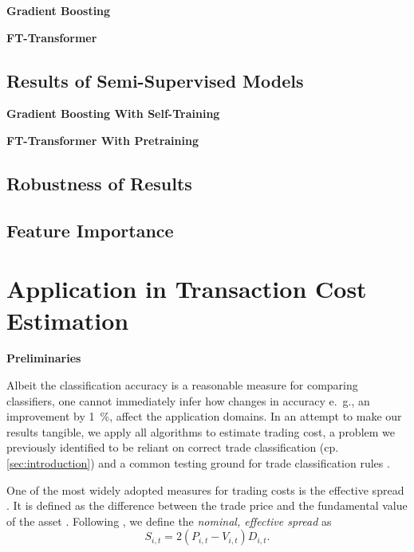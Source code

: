 \textbf{Gradient Boosting}

\textbf{FT-Transformer}

\subsection{Results of Semi-Supervised
    Models}\label{sec:results-of-semi-supervised-models}


\textbf{Gradient Boosting With Self-Training}

\textbf{FT-Transformer With Pretraining}

\subsection{Robustness of Results}\label{sec:robustness-checks}

\subsection{Feature Importance}\label{sec:feature-importance}

\newpage
\section{Application in Transaction Cost Estimation}\label{sec:application}

\textbf{Preliminaries}


Albeit the classification accuracy is a reasonable measure for comparing classifiers, one cannot immediately infer how changes in accuracy e.~g., an improvement by \SI{1}{\percent}, affect the application domains. In an attempt to make our results tangible, we apply all algorithms to estimate trading cost, a problem we previously identified to be reliant on correct trade classification (cp. \cref{sec:introduction}) and a common testing ground for trade classification rules \autocites[cp.][541]{ellisAccuracyTradeClassification2000}[][569]{finucaneDirectTestMethods2000}[][271--278]{petersonEvaluationBiasesExecution2003}[][896--897]{savickasInferringDirectionOption2003}.

One of the most widely adopted measures for trading costs is the effective spread \autocite[][112]{Piwowar_2006}. It is defined as the difference between the trade price and the fundamental value of the asset \autocite[][238--239]{bessembinderIssuesAssessingTrade2003}. Following \textcite[][238--239]{bessembinderIssuesAssessingTrade2003}, we define the \emph{nominal, effective spread} as
\begin{equation}
    S_{i,t} = 2 (P_{i,t} - V_{i,t}) D_{i,t}.
    \label{eq:effective-spread}
\end{equation}

